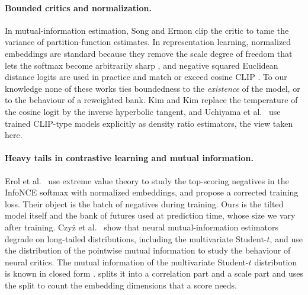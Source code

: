 \documentclass[11pt]{article}
\theoremstyle{plain}
\theoremstyle{definition}
\theoremstyle{remark}
\begin{document}
\paragraph{Bounded critics and normalization.}
In mutual-information estimation, Song and Ermon \cite{song2020limitations}
clip the critic to tame the variance of partition-function estimates. In
representation learning, normalized embeddings are standard because they
remove the scale degree of freedom that lets the softmax become arbitrarily
sharp \cite{chen2020simclr,wang2020understanding}, and negative squared
Euclidean distance logits are used in practice and match or exceed cosine
CLIP \cite{chou2024embedding}. To our knowledge none of these works ties
boundedness to the \emph{existence} of the model, or to the behaviour of a
reweighted bank. Kim and Kim \cite{kim2025temperature} replace the
temperature of the cosine logit by the inverse hyperbolic tangent, and
Uchiyama et al.\ \cite{uchiyama2025clip} use trained CLIP-type models
explicitly as density ratio estimators, the view taken here.

\paragraph{Heavy tails in contrastive learning and mutual information.}
Erol et al.\ \cite{erol2026softmax} use extreme value theory to study the
top-scoring negatives in the InfoNCE softmax with normalized embeddings, and
propose a corrected training loss. Their object is the batch of negatives
during training. Ours is the tilted model itself and the bank of futures used
at prediction time, whose size we vary after training. Czy\.z et al.\
\cite{czyz2023beyond} show that neural mutual-information estimators degrade
on long-tailed distributions, including the multivariate Student-$t$, and
\cite{czyz2023pmi} use the distribution of the pointwise mutual information
to study the behaviour of neural critics. The mutual information of the
multivariate Student-$t$ distribution is known in closed form
\cite{calsaverini2009information,arellano2013shannon}.
 splits it into a correlation part and a scale part and
uses the split to count the embedding dimensions that a score needs.
\end{document}

